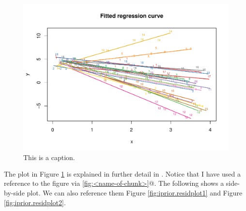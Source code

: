 \begin{knitrout}
\color{fgcolor}\begin{figure}[h]

{\centering \includegraphics[width=\maxwidth]{figure/iprior_plot-1} 

}

\caption[This is a caption]{This is a caption.}\label{fig:iprior.plot}
\end{figure}


\end{knitrout}

The plot in Figure \ref{fig:iprior.plot} is explained in further detail in \cite{jamil2017}. Notice that I have used a reference to the figure via \verb@\ref{fig:<name-of-chunk>}@. The following shows a side-by-side plot. We can also reference them Figure \ref{fig:iprior.residplot1} and Figure \ref{fig:iprior.residplot2}.

